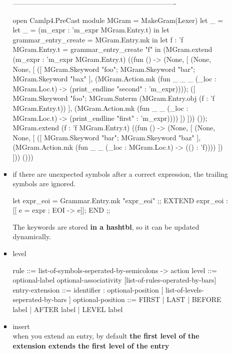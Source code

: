\begin{enumerate}
\begin{enumerate}[(a)]
\begin{itemize}
  \begin{redcode}
----------------------------------------------------------------------
\end{redcode}
\begin{bluecode}
open Camlp4.PreCast
module MGram = MakeGram(Lexer)
let _ =
  let _ = (m_expr : 'm_expr MGram.Entry.t) in
  let grammar_entry_create = MGram.Entry.mk in
  let f : 'f MGram.Entry.t = grammar_entry_create "f"
  in
    (MGram.extend (m_expr : 'm_expr MGram.Entry.t)
       ((fun () ->
           (None,
            [ (None, None,
               [ ([ MGram.Skeyword "foo"; MGram.Skeyword "bar";
                    MGram.Skeyword "bax" ],
                  (MGram.Action.mk
                     (fun _ _ _ (_loc : MGram.Loc.t) ->
                        (print_endline "second" : 'm_expr))));
                 ([ MGram.Skeyword "foo";
                    MGram.Snterm (MGram.Entry.obj (f : 'f MGram.Entry.t)) ],
                  (MGram.Action.mk
                     (fun _ _ (_loc : MGram.Loc.t) ->
                        (print_endline "first" : 'm_expr)))) ]) ]))
          ());
     MGram.extend (f : 'f MGram.Entry.t)
       ((fun () ->
           (None,
            [ (None, None,
               [ ([ MGram.Skeyword "bar"; MGram.Skeyword "baz" ],
                  (MGram.Action.mk
                     (fun _ _ (_loc : MGram.Loc.t) -> (() : 'f)))) ]) ]))
          ()))
        \end{bluecode}
        
\item if there are unexpected symbols after a correct expression, the trailing symbols are ignored.

\begin{bluecode}
let expr_eoi = Grammar.Entry.mk "expr_eoi" ;;
EXTEND expr_eoi : [[ e = expr ; EOI -> e]]; END ;;
\end{bluecode}

The keywords are stored {\bf in a hashtbl}, so it can be updated
dynamically.

\item level \\
  \begin{bluetext}
  rule ::= list-of-symbols-seperated-by-semicolons -> action 
  level ::=  optional-label optional-associativity
  [list-of-rules-operated-by-bars] 
  entry-extension ::=
  identifier : optional-position  [ list-of-levels-seperated-by-bars ] 
  optional-position ::= FIRST | LAST | BEFORE label | AFTER label |
  LEVEL label  
  \end{bluetext}
\item insert  \\
  when you extend an entry, by default \textbf{ the first level of the
    extension extends the first level of the entry}


\end{itemize}
\end{enumerate}
\end{enumerate}
